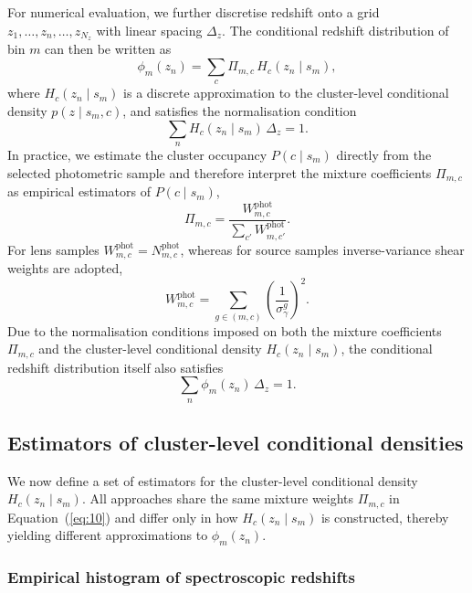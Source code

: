 For numerical evaluation, we further discretise redshift onto a grid \(z_1, \ldots, z_n, \ldots, z_{N_z}\) with linear spacing \(\Delta_z\). The conditional redshift distribution of bin \(m\) can then be written as
\begin{equation} \label{eq:10}
    \phi_m(z_n) = \sum_{c} \Pi_{m,c} \, H_c(z_n \mid s_m),
\end{equation}
where \(H_c(z_n \mid s_m)\) is a discrete approximation to the cluster-level conditional density \(p(z \mid s_m, c)\), and satisfies the normalisation condition
\begin{equation} \label{eq:11}
    \sum_n H_c(z_n \mid s_m) \, \Delta_z = 1.
\end{equation}
In practice, we estimate the cluster occupancy \(P(c \mid s_m)\) directly from the selected photometric sample and therefore interpret the mixture coefficients \(\Pi_{m,c}\) as empirical estimators of \(P(c \mid s_m)\),
\begin{equation} \label{eq:12}
    \Pi_{m,c} = \frac{W_{m,c}^\mathrm{phot}}{\sum_{c'} W_{m,c'}^\mathrm{phot}}.
\end{equation}
For lens samples \(W_{m,c}^\mathrm{phot} = N_{m,c}^\mathrm{phot}\), whereas for source samples inverse-variance shear weights are adopted,
\begin{equation} \label{eq:13}
    W_{m,c}^\mathrm{phot} = \sum_{g \in (m,c)} \left(\frac{1}{\sigma_\gamma^g}\right)^2.
\end{equation}
Due to the normalisation conditions imposed on both the mixture coefficients \(\Pi_{m,c}\) and the cluster-level conditional density \(H_c(z_n \mid s_m)\), the conditional redshift distribution itself also satisfies
\begin{equation} \label{eq:14}
    \sum_n \phi_m(z_n) \, \Delta_z = 1.
\end{equation}

\subsection{Estimators of cluster-level conditional densities} \label{sec:2.2}

We now define a set of estimators for the cluster-level conditional density \(H_c(z_n \mid s_m)\). All approaches share the same mixture weights \(\Pi_{m,c}\) in Equation~(\ref{eq:10}) and differ only in how \(H_c(z_n \mid s_m)\) is constructed, thereby yielding different approximations to \(\phi_m(z_n)\).

\subsubsection{Empirical histogram of spectroscopic redshifts} \label{sec:2.2.1}


